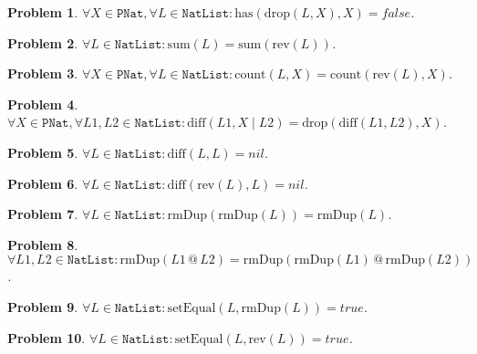 \documentclass[12pt, a4paper]{article}
\newtheorem{problem}{Problem}
\newcommand{\rel}[1]{\mathrel{#1}}
\newcommand{\rmx}[1]{\mathrm{#1}}
\begin{document}
\begin{problem}
$\forall X \in \mathtt{PNat}, \forall L \in \mathtt{NatList} \colon \rmx{has}(\rmx{drop}(L, X), X) = false$.
\end{problem}

\begin{problem}
$\forall L \in \mathtt{NatList} \colon \rmx{sum}(L) = \rmx{sum}(\rmx{rev}(L))$.
\end{problem}

\begin{problem}
$\forall X \in \mathtt{PNat}, \forall L \in \mathtt{NatList} \colon \rmx{count}(L, X) = \rmx{count}(\rmx{rev}(L), X)$.
\end{problem}

\begin{problem}
$\forall X \in \mathtt{PNat}, \forall L1, L2 \in \mathtt{NatList} \colon \rmx{diff}(L1, X \mid L2) = \rmx{drop}(\rmx{diff}(L1, L2), X)$.
\end{problem}


\begin{problem}
$\forall L \in \mathtt{NatList} \colon \rmx{diff}(L, L) = nil$.
\end{problem}

\begin{problem}
$\forall L \in \mathtt{NatList} \colon \rmx{diff}(\rmx{rev}(L), L) = nil$.
\end{problem}

\begin{problem}
$\forall L \in \mathtt{NatList} \colon \rmx{rmDup}(\rmx{rmDup}(L)) = \rmx{rmDup}(L)$.
\end{problem}

\begin{problem}
$\forall L1, L2 \in \mathtt{NatList} \colon \rmx{rmDup}(L1 \rel{@} L2) = \rmx{rmDup}(\rmx{rmDup}(L1) \rel{@} \rmx{rmDup}(L2))$.
\end{problem}

\begin{problem}
$\forall L \in \mathtt{NatList} \colon \rmx{setEqual}(L, \rmx{rmDup}(L)) = true$.
\end{problem}

\begin{problem}
$\forall L \in \mathtt{NatList} \colon \rmx{setEqual}(L, \rmx{rev}(L)) = true$.
\end{problem}

%
%
\end{document}
